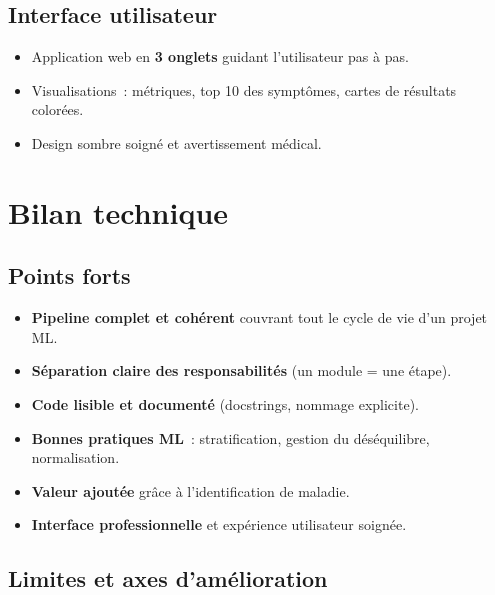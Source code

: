 \documentclass[11pt,a4paper]{article}
\begin{document}
\subsection{Interface utilisateur}
\begin{itemize}
  \item Application web en \textbf{3 onglets} guidant l'utilisateur pas à pas.
  \item Visualisations~: métriques, top 10 des symptômes, cartes de résultats colorées.
  \item Design sombre soigné et avertissement médical.
\end{itemize}

\section{Bilan technique}

\subsection{Points forts}
\begin{itemize}
  \item \textbf{Pipeline complet et cohérent} couvrant tout le cycle de vie d'un projet ML.
  \item \textbf{Séparation claire des responsabilités} (un module = une étape).
  \item \textbf{Code lisible et documenté} (docstrings, nommage explicite).
  \item \textbf{Bonnes pratiques ML}~: stratification, gestion du déséquilibre, normalisation.
  \item \textbf{Valeur ajoutée} grâce à l'identification de maladie.
  \item \textbf{Interface professionnelle} et expérience utilisateur soignée.
\end{itemize}

\subsection{Limites et axes d'amélioration}
\end{document}
